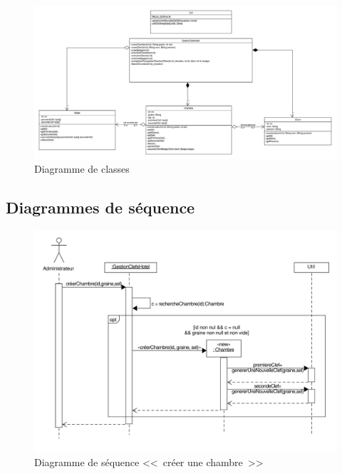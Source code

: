 \documentclass[11pt,article]{article}
\begin{document}
\begin{figure}[h!]
\begin{center}
\includegraphics[scale=0.4]{DiagrammesDeClasses/gestionclefshotel_uml_diag_classes}
\caption{Diagramme de classes}
\end{center}
\label{umlet_diag_classes}
\end{figure}

\newpage

\subsection{Diagrammes de séquence}

\begin{figure}[h!]
\begin{center}
\includegraphics[scale=0.4]{DiagrammesDeSequence/gestionclefshotel_uml_diag_seq_creer_chambre}
\caption{Diagramme de séquence <<~créer une chambre~>>}
\end{center}
\label{umlet_diag_classes}
\end{figure}
\end{document}
